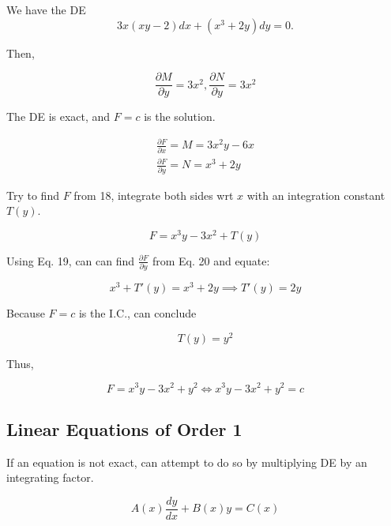\begin{example} We have the DE
    \begin{equation}
        3x(xy-2)dx+(x^3+2y)dy=0.
    \end{equation}

    Then, 

    \begin{equation}
        \frac{\partial M}{\partial y}=3x^2,\frac{\partial N}{\partial y}=3x^2
    \end{equation}

    The DE is exact, and $F=c$ is the solution.

    \begin{eqnarray}
        \frac{\partial F}{\partial x}=M=3x^2y-6x\\
        \frac{\partial F}{\partial y}=N=x^3+2y
    \end{eqnarray}

    Try to find $F$ from 18, integrate both sides wrt $x$ with an integration constant $T(y)$.

    \begin{equation}
        F=x^3y-3x^2+T(y)
    \end{equation}

    Using Eq. 19, can can find $\frac{\partial F}{\partial y}$ from Eq. 20 and equate:

    \begin{equation}
        x^3+T'(y)=x^3+2y\implies T'(y)=2y
    \end{equation}

    Because $F=c$ is the I.C., can conclude 

    \begin{equation}
        T(y)=y^2
    \end{equation}

    Thus,

    \begin{equation}
        F=x^3y-3x^2+y^2\Leftrightarrow x^3y-3x^2+y^2=c
    \end{equation}
\end{example}

\subsection{Linear Equations of Order 1}

If an equation is not exact, can attempt to do so by multiplying DE by an integrating factor.

\begin{definition}
    \begin{equation}
        A(x)\frac{dy}{dx}+B(x)y=C(x)
    \end{equation}
\end{definition}

